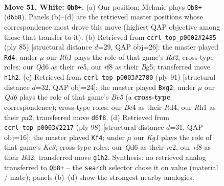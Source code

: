 \documentclass[11pt]{article}
\begin{document}
\clearpage

\begin{figure}[p]\centering
\begin{subfigure}{0.46\textwidth}\centering
\resizebox{\linewidth}{!}{%
\newchessgame
\chessboard[
  setfen={4kr2/1b6/3Q4/8/2B5/7P/1p4P1/6KR w - - 11 51},
  showmover=false,
  pgfstyle=straightmove, color=movearrow, markmove={d6-b8}
]}
\caption{}
\end{subfigure}\hfill
\begin{subfigure}{0.46\textwidth}\centering
\resizebox{\linewidth}{!}{%
\newchessgame
\chessboard[
  setfen={6k1/3r1p2/7p/4R1b1/1PB5/5K1P/8/8 b - - 2 43},
  showmover=false,
  pgfstyle=straightmove, color=movearrow, markmove={d7-d4}
]}
\caption{}
\end{subfigure}
\\[4pt]
\begin{subfigure}{0.46\textwidth}\centering
\resizebox{\linewidth}{!}{%
\newchessgame
\chessboard[
  setfen={8/8/p7/7k/3rb3/8/P2p1KR1/3R4 b - - 0 46},
  showmover=false,
  pgfstyle=straightmove, color=movearrow, markmove={e4-g2}
]}
\caption{}
\end{subfigure}\hfill
\begin{subfigure}{0.46\textwidth}\centering
\resizebox{\linewidth}{!}{%
\newchessgame
\chessboard[
  setfen={8/8/2b2k1p/8/3RP2P/4K3/2rB4/8 w - - 1 50},
  showmover=false,
  pgfstyle=straightmove, color=movearrow, markmove={e3-f4}
]}
\caption{}
\end{subfigure}
\caption{\textbf{Move 51, White: \texttt{Qb8+}.} (a) Our position; Melanie plays \texttt{Qb8+} (\texttt{d6b8}). Panels (b)--(d) are the retrieved master positions whose correspondence most drove this move (highest QAP objective among those that transfer to it). (b) Retrieved from \texttt{ccrl\_top\_p0002\#2485} (ply 85) [structural distance $d$=29, QAP obj=26]: the master played \texttt{Rd4}; under $\mu$ our \emph{Rh1} plays the role of that game's \emph{Rd2}; cross-type roles: our \emph{Q}d6 as their \emph{r}e5, our \emph{r}f8 as their \emph{B}g5; transferred move \texttt{h1h2}. (c) Retrieved from \texttt{ccrl\_top\_p0003\#2780} (ply 91) [structural distance $d$=32, QAP obj=24]: the master played \texttt{Bxg2}; under $\mu$ our \emph{Qd6} plays the role of that game's \emph{Be5} (a \textbf{cross-type} correspondence); cross-type roles: our \emph{B}c4 as their \emph{R}d4, our \emph{R}h1 as their \emph{p}a2; transferred move \texttt{d6f8}. (d) Retrieved from \texttt{ccrl\_top\_p0003\#2217} (ply 98) [structural distance $d$=31, QAP obj=16]: the master played \texttt{Kf4}; under $\mu$ our \emph{Kg1} plays the role of that game's \emph{Ke3}; cross-type roles: our \emph{Q}d6 as their \emph{r}c2, our \emph{r}f8 as their \emph{B}d2; transferred move \texttt{g1h2}. Synthesis: no retrieved analog transferred to \texttt{Qb8+} -- the \texttt{search} selector chose it on value (material / mate); panels (b)--(d) show the strongest nearby analogies.}
\label{fig:thought-m100}
\end{figure}
\end{document}
